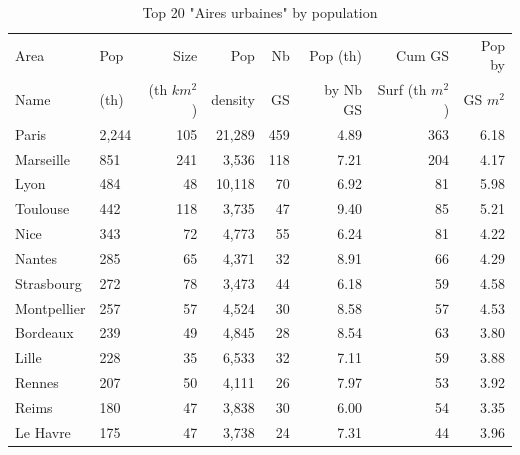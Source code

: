 \documentclass[11pt]{article}
\begin{document}
\begin{table}[H]
\caption{Top 20 "Aires urbaines" by population}
\small
\renewcommand{\arraystretch}{0.7}%

\begin{tabular}{llrrrrrr}
\toprule
\toprule
Area             &      Pop   &   Size     &  Pop       & Nb         &  Pop (th)  & Cum GS          & Pop by   \\
Name             &      (th)  & (th $km^2$)&  density   & GS         &  by Nb GS  & Surf (th $m^2$) & GS $m^2$ \\
\midrule
         Paris &      2,244 &        105 &       21,289 &        459 &       4.89 &        363 &        6.18 \\
     Marseille &        851 &        241 &        3,536 &        118 &       7.21 &        204 &        4.17 \\
          Lyon &        484 &         48 &       10,118 &         70 &       6.92 &         81 &        5.98 \\
      Toulouse &        442 &        118 &        3,735 &         47 &       9.40 &         85 &        5.21 \\
          Nice &        343 &         72 &        4,773 &         55 &       6.24 &         81 &        4.22 \\
        Nantes &        285 &         65 &        4,371 &         32 &       8.91 &         66 &        4.29 \\
    Strasbourg &        272 &         78 &        3,473 &         44 &       6.18 &         59 &        4.58 \\
   Montpellier &        257 &         57 &        4,524 &         30 &       8.58 &         57 &        4.53 \\
      Bordeaux &        239 &         49 &        4,845 &         28 &       8.54 &         63 &        3.80 \\
         Lille &        228 &         35 &        6,533 &         32 &       7.11 &         59 &        3.88 \\
        Rennes &        207 &         50 &        4,111 &         26 &       7.97 &         53 &        3.92 \\
         Reims &        180 &         47 &        3,838 &         30 &       6.00 &         54 &        3.35 \\
      Le Havre &        175 &         47 &        3,738 &         24 &       7.31 &         44 &        3.96 \\

\end{tabular}
\end{table}
\end{document}
